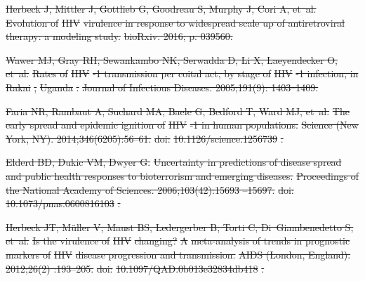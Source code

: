 \documentclass[10pt,letterpaper]{article}
\providecommand{\DIFdeltex}[1]{{\protect\color{red}\sout{#1}}}                      %
\providecommand{\DIFdel}[1]{\texorpdfstring{\DIFdeltex{#1}}{}} %
\begin{document}
\DIFdel{Herbeck J, Mittler J, Gottlieb G, Goodreau S, Murphy J, Cori A, et~al.
}%
\DIFdel{Evolution of }%
\DIFdel{HIV}%
\DIFdel{virulence in response to widespread scale up of
  antiretroviral therapy: a modeling study.
}%
\DIFdel{bioRxiv. 2016; p. 039560.
}%

\DIFdel{Wawer MJ, Gray RH, Sewankambo NK, Serwadda D, Li X, Laeyendecker O, et~al.
}%
\DIFdel{Rates of }%
\DIFdel{HIV}%
\DIFdel{-1 transmission per coital act, by stage of }%
\DIFdel{HIV}%
\DIFdel{-1
  infection, in }%
\DIFdel{Rakai}%
\DIFdel{, }%
\DIFdel{Uganda}%
\DIFdel{.
}%
\DIFdel{Journal of Infectious Diseases. 2005;191(9):
1403--1409.
}%

\DIFdel{Faria NR, Rambaut A, Suchard MA, Baele G, Bedford T, Ward MJ, et~al.
}%
\DIFdel{The early spread and epidemic ignition of }%
\DIFdel{HIV}%
\DIFdel{-1 in human
  populations.
}%
\DIFdel{Science (New York, NY). 2014;346(6205):56--61.
}%
\DIFdel{doi:}%
\DIFdel{10.1126/science.1256739}%
\DIFdel{.
}%

\DIFdel{Elderd BD, Dukic VM, Dwyer G.
}%
\DIFdel{Uncertainty in predictions of disease spread and public health
  responses to bioterrorism and emerging diseases.
}%
\DIFdel{Proceedings of the National Academy of Sciences. 2006;103(42):15693
  --15697.
}%
\DIFdel{doi:}%
\DIFdel{10.1073/pnas.0600816103}%
\DIFdel{.
}%

\DIFdel{Herbeck JT, Müller V, Maust BS, Ledergerber B, Torti C, Di~Giambenedetto S,
  et~al.
}%
\DIFdel{Is the virulence of }%
\DIFdel{HIV}%
\DIFdel{changing? }%
\DIFdel{A}%
\DIFdel{meta-analysis of trends in prognostic markers of }%
\DIFdel{HIV}%
\DIFdel{disease progression and transmission.
}%
\DIFdel{AIDS (London, England). 2012;26(2) :193--205.
}%
\DIFdel{doi:}%
\DIFdel{10.1097/QAD.0b013e32834db418}%
\DIFdel{.
}%
\end{document}
